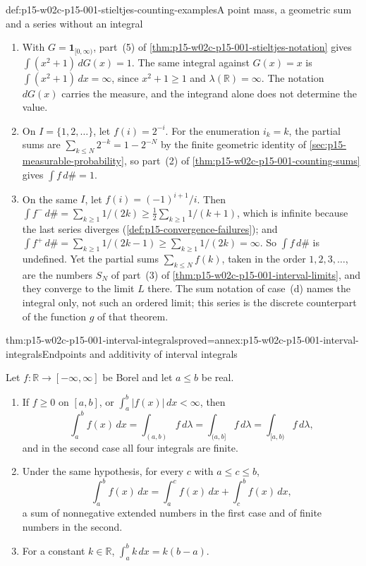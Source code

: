 \begin{hbexample}{def:p15-w02c-p15-001-stieltjes-counting-examples}{A point mass, a geometric sum and a series without an integral}
\begin{enumerate}
\item With \(G=\mathbf1_{[0,\infty)}\), part~(5) of
      \cref{thm:p15-w02c-p15-001-stieltjes-notation} gives
      \(\int(x^2+1)\,dG(x)=1\). The same integral against \(G(x)=x\) is
      \(\int(x^2+1)\,dx=\infty\), since \(x^2+1\geq1\) and
      \(\lambda(\mathbb R)=\infty\). The notation \(dG(x)\) carries the
      measure, and the integrand alone does not determine the value.
\item On \(I=\{1,2,\ldots\}\), let \(f(i)=2^{-i}\). For the enumeration
      \(i_k=k\), the partial sums are \(\sum_{k\leq N}2^{-k}=1-2^{-N}\)
      by the finite geometric identity of
      \cref{sec:p15-measurable-probability}, so part~(2) of
      \cref{thm:p15-w02c-p15-001-counting-sums} gives \(\int f\,d\#=1\).
\item On the same \(I\), let \(f(i)=(-1)^{i+1}/i\). Then
      \(\int f^-\,d\#=\sum_{k\geq1}1/(2k)\geq\frac12\sum_{k\geq1}1/(k+1)\),
      which is infinite because the last series diverges
      (\cref{def:p15-convergence-failures}); and
      \(\int f^+\,d\#=\sum_{k\geq1}1/(2k-1)\geq\sum_{k\geq1}1/(2k)=\infty\).
      So \(\int f\,d\#\) is undefined. Yet the partial sums
      \(\sum_{k\leq N}f(k)\), taken in the order \(1,2,3,\ldots\), are the
      numbers \(S_N\) of part~(3) of
      \cref{thm:p15-w02c-p15-001-interval-limits}, and they converge to
      the limit \(L\) there. The sum notation of case~(d) names the
      integral only, not such an ordered limit; this series is the
      discrete counterpart of the function \(g\) of that theorem.
\end{enumerate}
\end{hbexample}

\begin{hblemma}{thm:p15-w02c-p15-001-interval-integrals}{proved=annex:p15-w02c-p15-001-interval-integrals}{Endpoints and additivity of interval integrals}
\par\nobreak
Let \(f:\mathbb R\to[-\infty,\infty]\) be Borel and let \(a\leq b\) be
real.
\begin{enumerate}
\item If \(f\geq0\) on \([a,b]\), or \(\int_a^b|f(x)|\,dx<\infty\), then
      \[
       \int_a^b f(x)\,dx=\int_{(a,b)}f\,d\lambda=\int_{(a,b]}f\,d\lambda
       =\int_{[a,b)}f\,d\lambda,
      \]
      and in the second case all four integrals are finite.
\item Under the same hypothesis, for every \(c\) with \(a\leq c\leq b\),
      \[
       \int_a^b f(x)\,dx=\int_a^c f(x)\,dx+\int_c^b f(x)\,dx ,
      \]
      a sum of nonnegative extended numbers in the first case and of
      finite numbers in the second.
\item For a constant \(k\in\mathbb R\), \(\int_a^b k\,dx=k(b-a)\).
\end{enumerate}
\end{hblemma}

